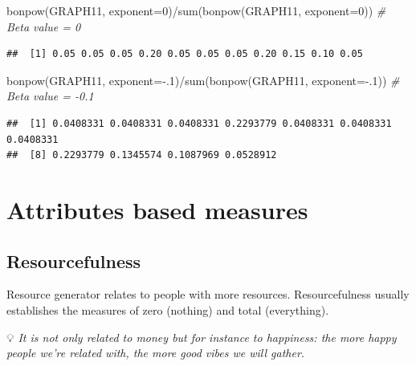 \documentclass[
  notitlepage,
  onecolumn,
  openany]{book}
\newenvironment{Shaded}{\begin{snugshade}}{\end{snugshade}}
\newcommand{\AttributeTok}[1]{\textcolor[rgb]{0.77,0.63,0.00}{#1}}
\newcommand{\CommentTok}[1]{\textcolor[rgb]{0.56,0.35,0.01}{\textit{#1}}}
\newcommand{\DecValTok}[1]{\textcolor[rgb]{0.00,0.00,0.81}{#1}}
\newcommand{\FunctionTok}[1]{\textcolor[rgb]{0.00,0.00,0.00}{#1}}
\newcommand{\NormalTok}[1]{#1}
\newcommand{\SpecialCharTok}[1]{\textcolor[rgb]{0.00,0.00,0.00}{#1}}
\begin{document}
\begin{Shaded}
\begin{Highlighting}[]
\FunctionTok{bonpow}\NormalTok{(GRAPH11, }\AttributeTok{exponent=}\DecValTok{0}\NormalTok{)}\SpecialCharTok{/}\FunctionTok{sum}\NormalTok{(}\FunctionTok{bonpow}\NormalTok{(GRAPH11, }\AttributeTok{exponent=}\DecValTok{0}\NormalTok{)) }\CommentTok{\# Beta value = 0}
\end{Highlighting}
\end{Shaded}

\begin{verbatim}
##  [1] 0.05 0.05 0.05 0.20 0.05 0.05 0.05 0.20 0.15 0.10 0.05
\end{verbatim}

\begin{Shaded}
\begin{Highlighting}[]
\FunctionTok{bonpow}\NormalTok{(GRAPH11, }\AttributeTok{exponent=}\SpecialCharTok{{-}}\NormalTok{.}\DecValTok{1}\NormalTok{)}\SpecialCharTok{/}\FunctionTok{sum}\NormalTok{(}\FunctionTok{bonpow}\NormalTok{(GRAPH11, }\AttributeTok{exponent=}\SpecialCharTok{{-}}\NormalTok{.}\DecValTok{1}\NormalTok{)) }\CommentTok{\# Beta value = {-}0.1}
\end{Highlighting}
\end{Shaded}

\begin{verbatim}
##  [1] 0.0408331 0.0408331 0.0408331 0.2293779 0.0408331 0.0408331 0.0408331
##  [8] 0.2293779 0.1345574 0.1087969 0.0528912
\end{verbatim}

\hypertarget{attributes-based-measures}{%
\chapter{Attributes based measures}\label{attributes-based-measures}}

\hypertarget{resourcefulness}{%
\section{Resourcefulness}\label{resourcefulness}}

Resource generator relates to people with more resources. Resourcefulness usually establishes the measures of zero (nothing) and total (everything).

💡 \emph{It is not only related to money but for instance to happiness: the more happy people we're related with, the more good vibes we will gather.}
\end{document}
